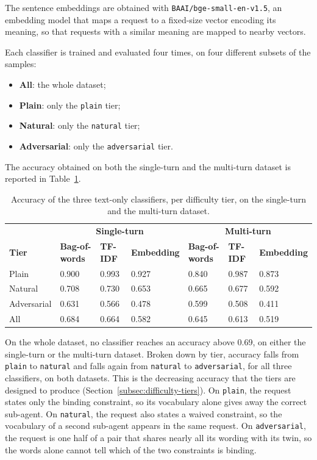 The sentence embeddings are obtained with \texttt{BAAI/bge-small-en-v1.5}, an embedding model that maps a request to a fixed-size vector encoding its meaning, so that requests with a similar meaning are mapped to nearby vectors.

Each classifier is trained and evaluated four times, on four different subsets of the samples:

\begin{itemize}
    \item \textbf{All}: the whole dataset;
    \item \textbf{Plain}: only the \texttt{plain} tier;
    \item \textbf{Natural}: only the \texttt{natural} tier;
    \item \textbf{Adversarial}: only the \texttt{adversarial} tier.
\end{itemize}

The accuracy obtained on both the single-turn and the multi-turn dataset is reported in Table~\ref{tab:text-baselines}.

\begin{table}[h]
    \centering
    \begin{tabular}{@{}l|lll|lll@{}}
        \toprule
        & \multicolumn{3}{c|}{\textbf{Single-turn}} & \multicolumn{3}{c}{\textbf{Multi-turn}} \\
        \textbf{Tier} & \textbf{Bag-of-words} & \textbf{TF-IDF} & \textbf{Embedding} & \textbf{Bag-of-words} & \textbf{TF-IDF} & \textbf{Embedding} \\
        \midrule
        Plain       & 0.900 & 0.993 & 0.927 & 0.840 & 0.987 & 0.873 \\
        Natural     & 0.708 & 0.730 & 0.653 & 0.665 & 0.677 & 0.592 \\
        Adversarial & 0.631 & 0.566 & 0.478 & 0.599 & 0.508 & 0.411 \\
        \midrule
        All         & 0.684 & 0.664 & 0.582 & 0.645 & 0.613 & 0.519 \\
        \bottomrule
    \end{tabular}
    \caption[Text-only classifier accuracy by difficulty tier, both datasets]{Accuracy of the three text-only classifiers, per difficulty tier, on the single-turn and the multi-turn dataset.}
    \label{tab:text-baselines}
\end{table}

On the whole dataset, no classifier reaches an accuracy above 0.69, on either the single-turn or the multi-turn dataset. Broken down by tier, accuracy falls from \texttt{plain} to \texttt{natural} and falls again from \texttt{natural} to \texttt{adversarial}, for all three classifiers, on both datasets. This is the decreasing accuracy that the tiers are designed to produce (Section~\ref{subsec:difficulty-tiers}). On \texttt{plain}, the request states only the binding constraint, so its vocabulary alone gives away the correct sub-agent. On \texttt{natural}, the request also states a waived constraint, so the vocabulary of a second sub-agent appears in the same request. On \texttt{adversarial}, the request is one half of a pair that shares nearly all its wording with its twin, so the words alone cannot tell which of the two constraints is binding.

